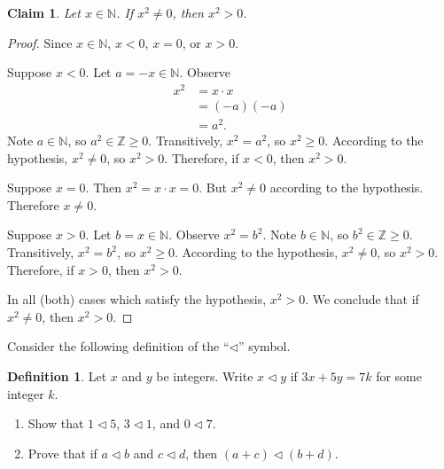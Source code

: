 \documentclass{article}
\newtheorem*{claim}{Claim}
\theoremstyle{definition}
\newtheorem*{definition}{Definition}
\begin{document}
\begin{solution}
\begin{claim}
Let $x\in\mathbb{N}$. If $x^2\neq 0$, then $x^2>0$.
\end{claim}\begin{proof}
Since $x\in\mathbb{N}$, $x<0$, $x=0$, or $x>0$.

Suppose $x<0$. Let $a=-x\in\mathbb{N}$. Observe
\begin{align*}
x^2
&=x\cdot x\\
&=(-a)(-a)\\
&=a^2.
\end{align*}
Note $a\in\mathbb{N}$, so $a^2\in\mathbb{Z}\geq 0$. Transitively, $x^2=a^2$, so $x^2\geq 0$. According to the hypothesis, $x^2\neq 0$, so $x^2>0$. Therefore, if $x<0$, then $x^2>0$.

Suppose $x=0$. Then $x^2=x\cdot x=0$. But $x^2\neq 0$ according to the hypothesis. Therefore $x\neq 0$.

Suppose $x>0$. Let $b=x\in\mathbb{N}$. Observe $x^2=b^2$. Note $b\in\mathbb{N}$, so $b^2\in\mathbb{Z}\geq 0$. Transitively, $x^2=b^2$, so $x^2\geq 0$.  According to the hypothesis, $x^2\neq 0$, so $x^2>0$. Therefore, if $x>0$, then $x^2>0$.

In all (both) cases which satisfy the hypothesis, $x^2>0$. We conclude that if $x^2\neq 0$, then $x^2>0$.
\end{proof}
\end{solution}
\begin{question}
    Consider the following definition of the ``$\triangleleft$'' symbol.
	\begin{definition}
	 Let $x$ and $y$ be integers. Write $x\triangleleft y$ if $3x+5y=7k$ for some integer $k$.
	\end{definition}
        \begin{enumerate}
           \item Show that $1\triangleleft 5$, $3\triangleleft 1$, and $0\triangleleft 7$.
           \item Prove that if $a\triangleleft b$ and $c\triangleleft d$, then $(a+c) \triangleleft (b+d)$.
        \end{enumerate}
\end{question}
\end{document}
